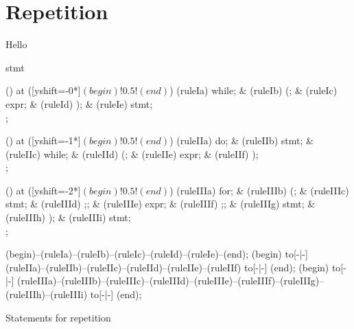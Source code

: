 \section{Repetition}
\label{sec:flow:repetition}

Hello

\begin{syntaxfloat}
  \begin{syntax}{stmt}
    
    \node[sequence] () at ([yshift=-0*\syntaxruledist]$(begin)!0.5!(end)$) {
      \node[terminal]    (ruleIa) {while};
      &
      \node[terminal]    (ruleIb) {(};
      &
      \node[nonterminal] (ruleIc) {expr};
      &
      \node[terminal]    (ruleId) {)};
      &
      \node[nonterminal] (ruleIe) {stmt};
      \\
    };
    
    \node[sequence] () at ([yshift=-1*\syntaxruledist]$(begin)!0.5!(end)$) {
      \node[terminal]    (ruleIIa) {do};
      &
      \node[nonterminal] (ruleIIb) {stmt};
      &
      \node[terminal]    (ruleIIc) {while};
      &
      \node[terminal]    (ruleIId) {(};
      &
      \node[nonterminal] (ruleIIe) {expr};
      &
      \node[terminal]    (ruleIIf) {)};
      \\
    };
    
    \node[sequence,column sep=0.6cm] () at ([yshift=-2*\syntaxruledist]$(begin)!0.5!(end)$) {
      \node[terminal]    (ruleIIIa) {for};
      &
      \node[terminal]    (ruleIIIb) {(};
      &
      \node[nonterminal] (ruleIIIc) {stmt};
      &
      \node[terminal]    (ruleIIId) {;};
      &
      \node[nonterminal] (ruleIIIe) {expr};
      &
      \node[terminal]    (ruleIIIf) {;};
      &
      \node[nonterminal] (ruleIIIg) {stmt};
      &
      \node[terminal]    (ruleIIIh) {)};
      &
      \node[nonterminal] (ruleIIIi) {stmt};
      \\
    };
    
    \draw[path] (begin)--(ruleIa)--(ruleIb)--(ruleIc)--(ruleId)--(ruleIe)--(end);
    \draw[path] (begin) to[-|-] (ruleIIa)--(ruleIIb)--(ruleIIc)--(ruleIId)--(ruleIIe)--(ruleIIf) to[-|-] (end);
    \draw[path] (begin) to[-|-] (ruleIIIa)--(ruleIIIb)--(ruleIIIc)--(ruleIIId)--(ruleIIIe)--(ruleIIIf)--(ruleIIIg)--(ruleIIIh)--(ruleIIIi) to[-|-] (end);
  \end{syntax}
  \caption{Statements for repetition}
\end{syntaxfloat}
